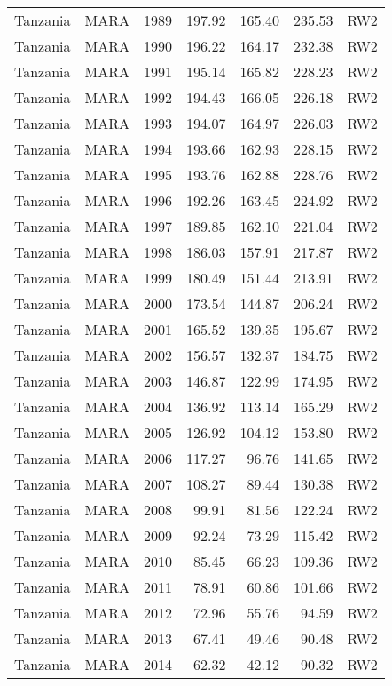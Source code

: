 \begin{longtable}{lllrrrl}
  Tanzania & MARA & 1989 & 197.92 & 165.40 & 235.53 & RW2 \\ 
  Tanzania & MARA & 1990 & 196.22 & 164.17 & 232.38 & RW2 \\ 
  Tanzania & MARA & 1991 & 195.14 & 165.82 & 228.23 & RW2 \\ 
  Tanzania & MARA & 1992 & 194.43 & 166.05 & 226.18 & RW2 \\ 
  Tanzania & MARA & 1993 & 194.07 & 164.97 & 226.03 & RW2 \\ 
  Tanzania & MARA & 1994 & 193.66 & 162.93 & 228.15 & RW2 \\ 
  Tanzania & MARA & 1995 & 193.76 & 162.88 & 228.76 & RW2 \\ 
  Tanzania & MARA & 1996 & 192.26 & 163.45 & 224.92 & RW2 \\ 
  Tanzania & MARA & 1997 & 189.85 & 162.10 & 221.04 & RW2 \\ 
  Tanzania & MARA & 1998 & 186.03 & 157.91 & 217.87 & RW2 \\ 
  Tanzania & MARA & 1999 & 180.49 & 151.44 & 213.91 & RW2 \\ 
  Tanzania & MARA & 2000 & 173.54 & 144.87 & 206.24 & RW2 \\ 
  Tanzania & MARA & 2001 & 165.52 & 139.35 & 195.67 & RW2 \\ 
  Tanzania & MARA & 2002 & 156.57 & 132.37 & 184.75 & RW2 \\ 
  Tanzania & MARA & 2003 & 146.87 & 122.99 & 174.95 & RW2 \\ 
  Tanzania & MARA & 2004 & 136.92 & 113.14 & 165.29 & RW2 \\ 
  Tanzania & MARA & 2005 & 126.92 & 104.12 & 153.80 & RW2 \\ 
  Tanzania & MARA & 2006 & 117.27 & 96.76 & 141.65 & RW2 \\ 
  Tanzania & MARA & 2007 & 108.27 & 89.44 & 130.38 & RW2 \\ 
  Tanzania & MARA & 2008 & 99.91 & 81.56 & 122.24 & RW2 \\ 
  Tanzania & MARA & 2009 & 92.24 & 73.29 & 115.42 & RW2 \\ 
  Tanzania & MARA & 2010 & 85.45 & 66.23 & 109.36 & RW2 \\ 
  Tanzania & MARA & 2011 & 78.91 & 60.86 & 101.66 & RW2 \\ 
  Tanzania & MARA & 2012 & 72.96 & 55.76 & 94.59 & RW2 \\ 
  Tanzania & MARA & 2013 & 67.41 & 49.46 & 90.48 & RW2 \\ 
  Tanzania & MARA & 2014 & 62.32 & 42.12 & 90.32 & RW2 \\ 

\end{longtable}
